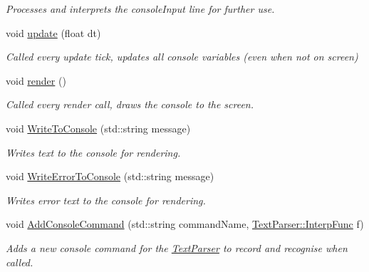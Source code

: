 \begin{DoxyCompactItemize}
\begin{DoxyCompactList}\small\item\em Processes and interprets the console\+Input line for further use. \end{DoxyCompactList}\item 
\hypertarget{class_debug_helper_a8ef4429ee0c1146b563c53d4a4b44ca8}{void \hyperlink{class_debug_helper_a8ef4429ee0c1146b563c53d4a4b44ca8}{update} (float dt)}\label{class_debug_helper_a8ef4429ee0c1146b563c53d4a4b44ca8}

\begin{DoxyCompactList}\small\item\em Called every update tick, updates all console variables (even when not on screen) \end{DoxyCompactList}\item 
\hypertarget{class_debug_helper_a2af378fe6006f6024d5486d8090732aa}{void \hyperlink{class_debug_helper_a2af378fe6006f6024d5486d8090732aa}{render} ()}\label{class_debug_helper_a2af378fe6006f6024d5486d8090732aa}

\begin{DoxyCompactList}\small\item\em Called every render call, draws the console to the screen. \end{DoxyCompactList}\item 
\hypertarget{class_debug_helper_a44cff1d53586f120fcab4b8e3e84e438}{void \hyperlink{class_debug_helper_a44cff1d53586f120fcab4b8e3e84e438}{Write\+To\+Console} (std\+::string message)}\label{class_debug_helper_a44cff1d53586f120fcab4b8e3e84e438}

\begin{DoxyCompactList}\small\item\em Writes text to the console for rendering. \end{DoxyCompactList}\item 
\hypertarget{class_debug_helper_a181175763a5aef7ace818e4c54618979}{void \hyperlink{class_debug_helper_a181175763a5aef7ace818e4c54618979}{Write\+Error\+To\+Console} (std\+::string message)}\label{class_debug_helper_a181175763a5aef7ace818e4c54618979}

\begin{DoxyCompactList}\small\item\em Writes error text to the console for rendering. \end{DoxyCompactList}\item 
\hypertarget{class_debug_helper_a0395140c6b19bba0c8e10809b22a136f}{void \hyperlink{class_debug_helper_a0395140c6b19bba0c8e10809b22a136f}{Add\+Console\+Command} (std\+::string command\+Name, \hyperlink{class_text_parser_a9cd16418d2032d830f4ed2c2624e703d}{Text\+Parser\+::\+Interp\+Func} f)}\label{class_debug_helper_a0395140c6b19bba0c8e10809b22a136f}

\begin{DoxyCompactList}\small\item\em Adds a new console command for the \hyperlink{class_text_parser}{Text\+Parser} to record and recognise when called. \end{DoxyCompactList}\end{DoxyCompactItemize}
